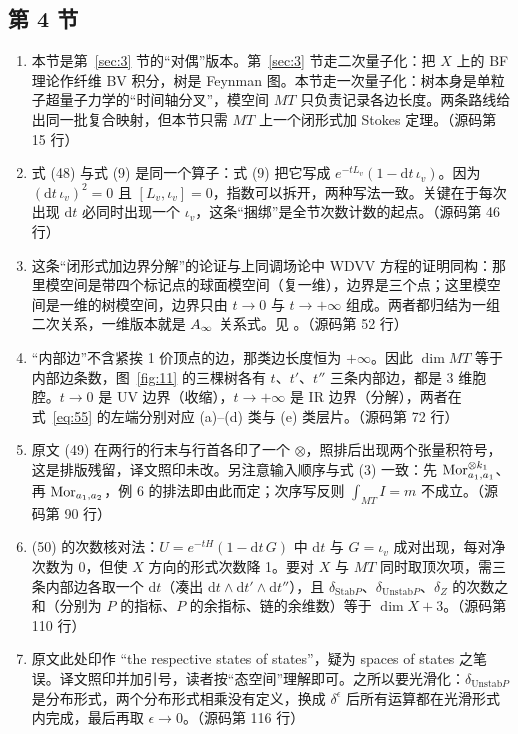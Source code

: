 \subsection*{第 4 节}
\begin{enumerate}
  \item 本节是第~\ref{sec:3} 节的“对偶”版本。第~\ref{sec:3} 节走二次量子化：把 $X$ 上的 BF 理论作纤维 BV 积分，树是 Feynman 图。本节走一次量子化：树本身是单粒子超量子力学的“时间轴分叉”，模空间 $MT$ 只负责记录各边长度。两条路线给出同一批复合映射，但本节只需 $MT$ 上一个闭形式加 Stokes 定理。\hfill{\footnotesize （源码第 15 行）}
  \item 式 (48) 与式 (9) 是同一个算子：式 (9) 把它写成 $e^{-tL_v}(1-\mathrm{d}t\,\iota_v)$。因为 $(\mathrm{d}t\,\iota_v)^2=0$ 且 $[L_v,\iota_v]=0$，指数可以拆开，两种写法一致。关键在于每次出现 $\mathrm{d}t$ 必同时出现一个 $\iota_v$，这条“捆绑”是全节次数计数的起点。\hfill{\footnotesize （源码第 46 行）}
  \item 这条“闭形式加边界分解”的论证与上同调场论中 WDVV 方程的证明同构：那里模空间是带四个标记点的球面模空间（复一维），边界是三个点；这里模空间是一维的树模空间，边界只由 $t\to0$ 与 $t\to+\infty$ 组成。两者都归结为一组二次关系，一维版本就是 $A_\infty$ 关系式。见 \cite{losev,kontsevichmanin}。\hfill{\footnotesize （源码第 52 行）}
  \item “内部边”不含紧挨 1 价顶点的边，那类边长度恒为 $+\infty$。因此 $\dim MT$ 等于内部边条数，图~\ref{fig:11} 的三棵树各有 $t$、$t'$、$t''$ 三条内部边，都是 3 维胞腔。$t\to0$ 是 UV 边界（收缩），$t\to+\infty$ 是 IR 边界（分解），两者在式~\eqref{eq:55} 的左端分别对应 (a)–(d) 类与 (e) 类层片。\hfill{\footnotesize （源码第 72 行）}
  \item 原文 (49) 在两行的行末与行首各印了一个 $\otimes$，照排后出现两个张量积符号，这是排版残留，译文照印未改。另注意输入顺序与式 (3) 一致：先 $\operatorname{Mor}_{a_1,a_1}^{\otimes k_1}$、再 $\operatorname{Mor}_{a_1,a_2}$，例 6 的排法即由此而定；次序写反则 $\int_{MT}I=m$ 不成立。\hfill{\footnotesize （源码第 90 行）}
  \item (50) 的次数核对法：$U=e^{-tH}(1-\mathrm{d}t\,G)$ 中 $\mathrm{d}t$ 与 $G=\iota_v$ 成对出现，每对净次数为 0，但使 $X$ 方向的形式次数降 1。要对 $X$ 与 $MT$ 同时取顶次项，需三条内部边各取一个 $\mathrm{d}t$（凑出 $\mathrm{d}t\wedge\mathrm{d}t'\wedge\mathrm{d}t''$），且 $\delta_{\mathrm{Stab}P}$、$\delta_{\mathrm{Unstab}P}$、$\delta_Z$ 的次数之和（分别为 $P$ 的指标、$P$ 的余指标、链的余维数）等于 $\dim X+3$。\hfill{\footnotesize （源码第 110 行）}
  \item 原文此处印作 “the respective states of states”，疑为 spaces of states 之笔误。译文照印并加引号，读者按“态空间”理解即可。之所以要光滑化：$\delta_{\mathrm{Unstab}P}$ 是分布形式，两个分布形式相乘没有定义，换成 $\delta^\epsilon$ 后所有运算都在光滑形式内完成，最后再取 $\epsilon\to0$。\hfill{\footnotesize （源码第 116 行）}

\end{enumerate}
